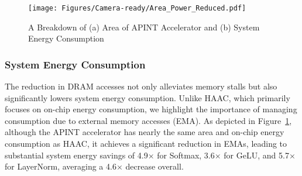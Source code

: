 \begin{figure} [t]
\vspace{-0.12in}
\centering
\texttt{[image: Figures/Camera-ready/Area\_Power\_Reduced.pdf]}
\caption{A Breakdown of (a) Area of APINT Accelerator and (b) System Energy Consumption}
\vspace{-0.2in}
\label{fig:power_result}
\end{figure}

\subsubsection{\textbf{System Energy Consumption}} The reduction in DRAM accesses not only alleviates memory stalls but also significantly lowers system energy consumption. Unlike HAAC, which primarily focuses on on-chip energy consumption, we highlight the importance of managing consumption due to external memory accesses (EMA). As depicted in Figure~\ref{fig:power_result}, although the APINT accelerator has nearly the same area and on-chip energy consumption as HAAC, it achieves a significant reduction in EMAs, leading to substantial system energy savings of 4.9$\times$ for Softmax, 3.6$\times$ for GeLU, and 5.7$\times$ for LayerNorm, averaging a 4.6$\times$ decrease overall.